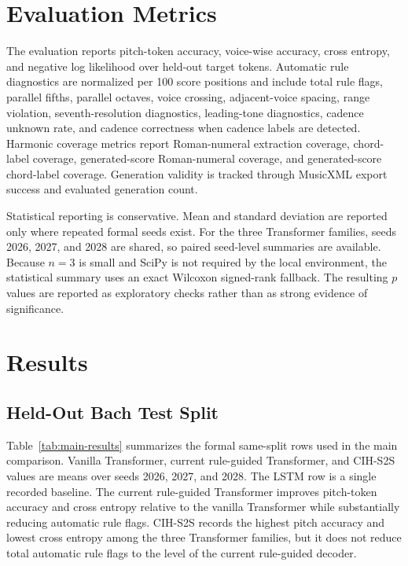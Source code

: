 \documentclass[11pt]{article}
\begin{document}
\section{Evaluation Metrics}

The evaluation reports pitch-token accuracy, voice-wise accuracy, cross entropy, and negative log likelihood over held-out target tokens. Automatic rule diagnostics are normalized per 100 score positions and include total rule flags, parallel fifths, parallel octaves, voice crossing, adjacent-voice spacing, range violation, seventh-resolution diagnostics, leading-tone diagnostics, cadence unknown rate, and cadence correctness when cadence labels are detected. Harmonic coverage metrics report Roman-numeral extraction coverage, chord-label coverage, generated-score Roman-numeral coverage, and generated-score chord-label coverage. Generation validity is tracked through MusicXML export success and evaluated generation count.

Statistical reporting is conservative. Mean and standard deviation are reported only where repeated formal seeds exist. For the three Transformer families, seeds 2026, 2027, and 2028 are shared, so paired seed-level summaries are available. Because $n=3$ is small and SciPy is not required by the local environment, the statistical summary uses an exact Wilcoxon signed-rank fallback. The resulting $p$ values are reported as exploratory checks rather than as strong evidence of significance.

\section{Results}

\subsection{Held-Out Bach Test Split}

Table~\ref{tab:main-results} summarizes the formal same-split rows used in the main comparison. Vanilla Transformer, current rule-guided Transformer, and CIH-S2S values are means over seeds 2026, 2027, and 2028. The LSTM row is a single recorded baseline. The current rule-guided Transformer improves pitch-token accuracy and cross entropy relative to the vanilla Transformer while substantially reducing automatic rule flags. CIH-S2S records the highest pitch accuracy and lowest cross entropy among the three Transformer families, but it does not reduce total automatic rule flags to the level of the current rule-guided decoder.
\end{document}
